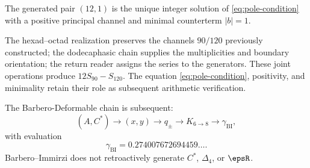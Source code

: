 \begin{proposition}
The generated pair \((12,1)\) is the unique integer solution of
\eqref{eq:pole-condition} with a positive principal channel and minimal
counterterm \(|b|=1\).
\end{proposition}

The hexad--octad realization preserves the channels \(90/120\)
previously constructed; the dodecaphasic chain supplies the multiplicities
and boundary orientation; the return reader assigns the series to the
generators. These joint operations produce \(12S_{90}-S_{120}\).
The equation \eqref{eq:pole-condition}, positivity, and minimality
retain their role as subsequent arithmetic verification.

The Barbero-Deformable chain is subsequent:
\[
(A,C^*)\to(x,y)\to q_\pm
\to K_{6\to8}\to\gamma_{\mathrm{BI}},
\]
with evaluation
\[
\gamma_{\mathrm{BI}}=0.274007672694459\ldots.
\]
Barbero--Immirzi does not retroactively generate \(C^*\), \(\Delta_4\), or
\(\epsR\).

